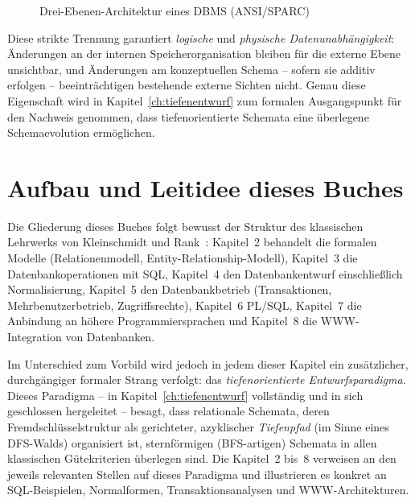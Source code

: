 ﻿\documentclass[a4paper,12pt]{report}
\theoremstyle{definition}
\theoremstyle{remark}
\begin{document}
\begin{figure}[H]
\centering
{}
\caption{Drei-Ebenen-Architektur eines DBMS (ANSI/SPARC)}
\label{fig:ansi-sparc}
\end{figure}

Diese strikte Trennung garantiert \emph{logische} und \emph{physische
Datenunabhängigkeit}: Änderungen an der internen Speicherorganisation
bleiben für die externe Ebene unsichtbar, und Änderungen am
konzeptuellen Schema -- sofern sie additiv erfolgen -- beeinträchtigen
bestehende externe Sichten nicht. Genau diese Eigenschaft wird in
Kapitel~\ref{ch:tiefenentwurf} zum formalen Ausgangspunkt für den
Nachweis genommen, dass tiefenorientierte Schemata eine überlegene
Schemaevolution ermöglichen.

\section{Aufbau und Leitidee dieses Buches}

Die Gliederung dieses Buches folgt bewusst der Struktur des klassischen
Lehrwerks von Kleinschmidt und Rank~\cite{Kleinschmidt2002}: Kapitel~2
behandelt die formalen Modelle (Relationenmodell,
Entity-Relationship-Modell), Kapitel~3 die Datenbankoperationen mit SQL,
Kapitel~4 den Datenbankentwurf einschließlich Normalisierung,
Kapitel~5 den Datenbankbetrieb (Transaktionen, Mehrbenutzerbetrieb,
Zugriffsrechte), Kapitel~6 PL/SQL, Kapitel~7 die Anbindung an höhere
Programmiersprachen und Kapitel~8 die WWW-Integration von Datenbanken.

Im Unterschied zum Vorbild wird jedoch in jedem dieser Kapitel ein
zusätzlicher, durchgängiger formaler Strang verfolgt: das
\emph{tiefenorientierte Entwurfsparadigma}. Dieses Paradigma -- in
Kapitel~\ref{ch:tiefenentwurf} vollständig und in sich geschlossen
hergeleitet -- besagt, dass relationale Schemata, deren
Fremdschlüsselstruktur als gerichteter, azyklischer \emph{Tiefenpfad}
(im Sinne eines DFS-Walds) organisiert ist, sternförmigen
(BFS-artigen) Schemata in allen klassischen Gütekriterien überlegen
sind. Die Kapitel~2 bis~8 verweisen an den jeweils relevanten Stellen
auf dieses Paradigma und illustrieren es konkret an SQL-Beispielen,
Normalformen, Transaktionsanalysen und WWW-Architekturen.
\end{document}
